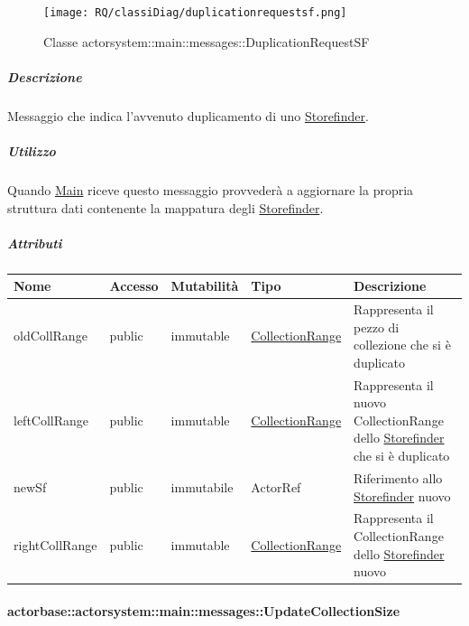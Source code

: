 \documentclass{scalatekids-article}
\begin{document}
\begin{figure}[H]
   \begin{center}
     \texttt{[image: RQ/classiDiag/duplicationrequestsf.png]}
     \caption{Classe actorsystem::main::messages::DuplicationRequestSF}
   \end{center}
 \end{figure}

\subparagraph{Descrizione}

Messaggio che indica l'avvenuto duplicamento di uno \hyperref[sec:actorbase::actorsystem::storefinder::Storefinder]{Storefinder}.

\subparagraph{Utilizzo}
Quando \hyperref[sec:actorbase::actorsystem::main::Main]{Main}
riceve questo messaggio provvederà a aggiornare la propria struttura dati
contenente la mappatura degli \hyperref[sec:actorbase::actorsystem::storefinder::Storefinder]{Storefinder}.

\subparagraph{Attributi}
\begin{tabular}{| p{3cm} | p{1.5cm} | p{2cm} | p{2cm} | p{8.5cm} |}
  \hline
  Nome & Accesso & Mutabilità & Tipo & Descrizione\\
  \hline
  oldCollRange & public & immutable & \hyperref[sec:actorbase::actorsystem::utils::CollectionRange]{CollectionRange} & Rappresenta il pezzo di collezione che si è duplicato\\
  \hline
  leftCollRange & public & immutable & \hyperref[sec:actorbase::actorsystem::utils::CollectionRange]{CollectionRange} & Rappresenta il nuovo CollectionRange dello \hyperref[sec:actorbase::actorsystem::storefinder::Storefinder]{Storefinder} che si è duplicato\\
  \hline
  newSf & public & immutabile & ActorRef & Riferimento allo \hyperref[sec:actorbase::actorsystem::storefinder::Storefinder]{Storefinder} nuovo\\
  \hline
  rightCollRange & public & immutable & \hyperref[sec:actorbase::actorsystem::utils::CollectionRange]{CollectionRange} & Rappresenta il CollectionRange dello \hyperref[sec:actorbase::actorsystem::storefinder::Storefinder]{Storefinder} nuovo\\
  \hline
\end{tabular}

\paragraph{actorbase::actorsystem::main::messages::UpdateCollectionSize}
\label{sec:actorbase::actorsystem::main::messages::UpdateCollectionSize}
\end{document}
